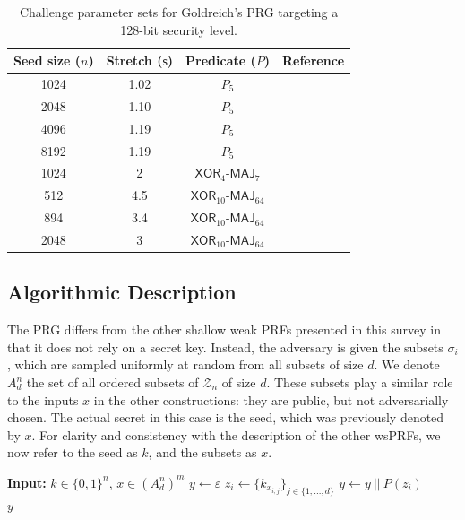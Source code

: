 \documentclass[journal=tosc,submission]{iacrtrans}
\theoremstyle{theorem}
\newcommand\Z{\mathcal{Z}}
\newcommand\lp[1]{\textcolor{blue!80}{\textbf{Léo:} #1}}
\newcommand\yr[1]{\textcolor{brown!80}{\textbf{Yann:} #1}}
\begin{document}
\begin{table}[!ht]
\centering
\begin{tabular}{cccc}
\toprule
Seed size ($n$) & Stretch ($\mathsf{s}$) & Predicate ($P$)& Reference\\
\midrule
1024 & 1.02 & $P_5$ & \cite{DBLP:journals/tit/YangGJL22} \\
2048 & 1.10 & $P_5$ & \cite{DBLP:journals/tit/YangGJL22} \\
4096 & 1.19 & $P_5$ & \cite{DBLP:journals/tit/YangGJL22} \\
8192 & 1.19 & $P_5$ & \cite{DBLP:conf/eurocrypt/AgarwalBBS25} \\
1024 & 2 & $\mathsf{XOR}_4\textsf{-}\mathsf{MAJ}_7$ & \cite{DBLP:conf/eurocrypt/AgarwalBBS25} \\
512 & 4.5 & $\mathsf{XOR}_{10}\textsf{-}\mathsf{MAJ}_{64}$ & \cite{EC:BCMPR24, EPRINT:FLLL24} \\
894 & 3.4 & $\mathsf{XOR}_{10}\textsf{-}\mathsf{MAJ}_{64}$ & \cite{AC:CDDKS24} \\
2048 & 3 & $\mathsf{XOR}_{10}\textsf{-}\mathsf{MAJ}_{64}$ & \cite{AC:CDDKS24} \\
\bottomrule
\end{tabular}
\caption{\label{tab:paramgar}Challenge parameter sets for Goldreich's PRG targeting a 128-bit security level.}
\end{table}

\subsection{Algorithmic Description}
The PRG differs from the other shallow weak PRFs presented in this survey in that it does not rely on a secret key. Instead, the adversary is given the subsets $\sigma_i$, which are sampled uniformly at random from all subsets of size $d$. We denote $A_d^n$ the set of all ordered subsets of $\Z_n$ of size $d$. These subsets play a similar role to the inputs $x$ in the other constructions: they are public, but not adversarially chosen. The actual secret in this case is the seed, which was previously denoted by $x$. For clarity and consistency with the description of the other wsPRFs, we now refer to the seed as $k$, and the subsets as $x$.


\begin{algorithm}
  \caption{\label{alg:gar}The Goldreich's PRF/PRG \\
    Parameters: $n$ (seed size), $m$ (output size), $d$ (locality) and $P:\{0,1\}^d \to \{0,1\}$ (predicate).}
  \begin{algorithmic}
  \State \textbf{Input:} $k\in\{0,1\}^n$, $x\in (A^n_d)^{m}$
    \State $y \gets \varepsilon$ 
        \State $z_i \gets \{k_{x_{i,j}}\}_{j \in \{1, ..., d\}}$
    	\State $y \gets y~||~P(z_i)$
	\EndFor  \\
    \Return $y$
  \end{algorithmic}
\end{algorithm}
\end{document}
